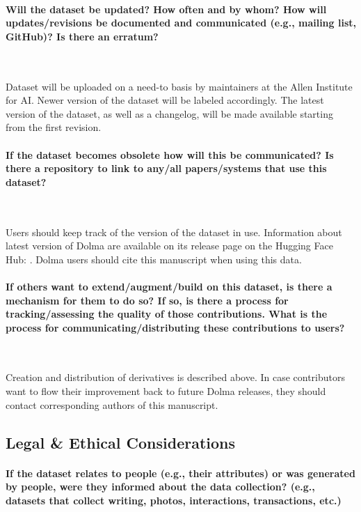 \documentclass{article}
\newcommand{\dolma}{Dolma\xspace}
\begin{document}
\paragraph{Will the dataset be updated? How often and by whom? How will updates/revisions be documented and communicated (e.g., mailing list, GitHub)? Is there an erratum?}~

Dataset will be uploaded on a need-to basis by maintainers at the Allen Institute for AI.
Newer version of the dataset will be labeled accordingly. 
The latest version of the dataset, as well as a changelog, will be made available starting from the first revision.

\paragraph{If the dataset becomes obsolete how will this be communicated? Is there a repository to link to any/all papers/systems that use this dataset?}~

Users should keep track of the version of the dataset in use. 
Information about latest version of \dolma  are available on its release page on the Hugging Face Hub: \href{https://huggingface.co/datasets/allenai/dolma}{}.
\dolma users should cite this manuscript when using this data.

\paragraph{If others want to extend/augment/build on this dataset, is there a mechanism for them to do so? If so, is there a process for tracking/assessing the quality of those contributions. What is the process for communicating/distributing these contributions to users?}~

Creation and distribution of derivatives is described above. 
In case contributors want to flow their improvement back to future \dolma releases, they should contact corresponding authors of this manuscript.

\subsection{Legal \& Ethical Considerations}
\paragraph{If the dataset relates to people (e.g., their attributes) or was generated by people, were they informed about the data collection? (e.g., datasets that collect writing, photos, interactions, transactions, etc.)}~
\end{document}
